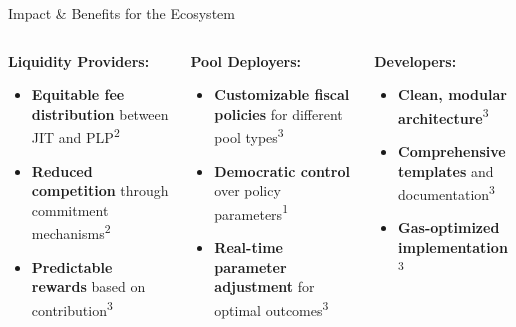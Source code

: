 \documentclass[aspectratio=169]{beamer}
\newcommand{\citeaquilina}{\textcolor{parityblue}{\textsuperscript{1}}}
\newcommand{\citecapponi}{\textcolor{paritygreen}{\textsuperscript{2}}}
\newcommand{\citema}{\textcolor{parityorange}{\textsuperscript{3}}}
\begin{document}

\begin{frame}{Impact \& Benefits for the Ecosystem}
    \vspace{-0.1cm} %
    
    \begin{columns}
        \begin{column}{0.33\textwidth}
            \textbf{Liquidity Providers:}
            \begin{itemize}
                \item \textcolor{paritygreen}{\textbf{Equitable fee distribution}} between JIT and PLP\citecapponi
                \item \textcolor{paritygreen}{\textbf{Reduced competition}} through commitment mechanisms\citecapponi
                \item \textcolor{paritygreen}{\textbf{Predictable rewards}} based on contribution\citema
            \end{itemize}
        \end{column}
        \begin{column}{0.33\textwidth}
            \textbf{Pool Deployers:}
            \begin{itemize}
                \item \textcolor{parityblue}{\textbf{Customizable fiscal policies}} for different pool types\citema
                \item \textcolor{parityblue}{\textbf{Democratic control}} over policy parameters\citeaquilina
                \item \textcolor{parityblue}{\textbf{Real-time parameter adjustment}} for optimal outcomes\citema
            \end{itemize}
        \end{column}
        \begin{column}{0.33\textwidth}
            \textbf{Developers:}
            \begin{itemize}
                \item \textcolor{parityorange}{\textbf{Clean, modular architecture}}\citema
                \item \textcolor{parityorange}{\textbf{Comprehensive templates}} and documentation\citema
                \item \textcolor{parityorange}{\textbf{Gas-optimized implementation}}\citema
            \end{itemize}
        \end{column}
    \end{columns}
    

\end{frame}
\end{document}
